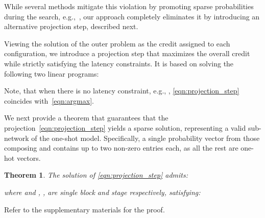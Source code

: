 \documentclass[dvipsnames,table,xcdraw]{article}
\newtheorem{theo}{Theorem}[section]
\begin{document}
While several methods mitigate this violation by promoting sparse probabilities during the search, e.g.,~\cite{noy2020asap, nayman2019xnas}, 
our approach completely eliminates it by introducing an alternative projection step, described next.

Viewing the solution of the outer problem  as the credit assigned to each configuration,
we introduce a projection step that maximizes the overall credit while strictly satisfying the latency constraints. It is based on solving the following two linear programs:

Note, that when there is no latency constraint, e.g., , \eqref{eqn:projection_step} coincides with~\eqref{eqn:argmax}.

We next provide a theorem that guarantees that the projection~\eqref{eqn:projection_step} yields a sparse solution, representing a valid sub-network of the one-shot model. Specifically, a single probability vector from those composing  and  contains up to two non-zero entries each, as all the rest are one-hot vectors. 
\begin{theo}
\label{thm:one_hot_sol}
The solution  of \eqref{eqn:projection_step} admits:

where  and , ,   are single block and stage respectively, satisfying:

\end{theo}
Refer to the supplementary materials for the proof.
\end{document}
